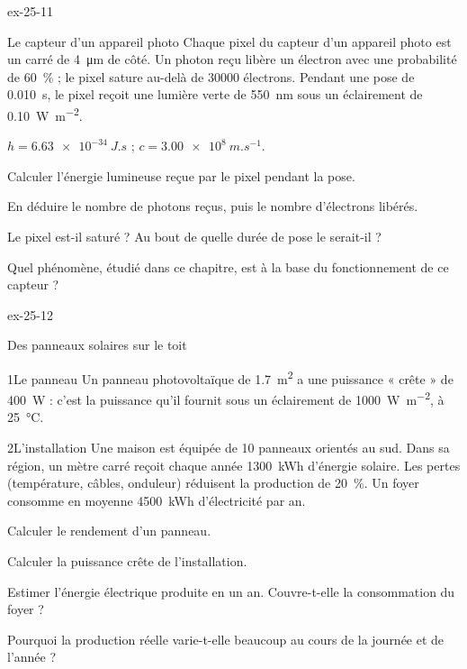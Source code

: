 \begin{blocLivre}{ex-25-11}
\begin{exercice}[2]{Le capteur d'un appareil photo}
Chaque pixel du capteur d'un appareil photo est un carré de \qty{4}{\micro m} de côté. Un photon reçu libère un électron avec
une probabilité de 60~\% ; le pixel sature au-delà de \num{30000} électrons. Pendant une pose de \qty{0,010}{s}, le pixel reçoit
une lumière verte de \qty{550}{nm} sous un éclairement de \qty{0,10}{W.m^{-2}}.
\begin{donnees}
$h=\qty{6,63e-34}{J.s}$ ; $c=\qty{3,00e8}{m.s^{-1}}$.
\end{donnees}
\begin{questions}
\item Calculer l'énergie lumineuse reçue par le pixel pendant la pose.
\item En déduire le nombre de photons reçus, puis le nombre d'électrons libérés.
\item Le pixel est-il saturé ? Au bout de quelle durée de pose le serait-il ?
\item Quel phénomène, étudié dans ce chapitre, est à la base du fonctionnement de ce capteur ?
\end{questions}
\end{exercice}
\end{blocLivre}
\begin{blocLivre}{ex-25-12}
\begin{exercice}[3]{Des panneaux solaires sur le toit}
\begin{docu}{1}{Le panneau}
Un panneau photovoltaïque de \qty{1,7}{m^2} a une puissance « crête » de \qty{400}{W} : c'est la puissance qu'il fournit sous un
éclairement de \qty{1000}{W.m^{-2}}, à \qty{25}{\degreeCelsius}.
\end{docu}
\begin{docu}{2}{L'installation}
Une maison est équipée de 10 panneaux orientés au sud. Dans sa région, un mètre carré reçoit chaque année
\qty{1300}{kWh} d'énergie solaire. Les pertes (température, câbles, onduleur) réduisent la production de 20~\%. Un foyer
consomme en moyenne \qty{4500}{kWh} d'électricité par an.
\end{docu}
\begin{questions}
\item Calculer le rendement d'un panneau.
\item Calculer la puissance crête de l'installation.
\item \initiative Estimer l'énergie électrique produite en un an. Couvre-t-elle la consommation du foyer ?
\item Pourquoi la production réelle varie-t-elle beaucoup au cours de la journée et de l'année ?
\end{questions}
\end{exercice}
\end{blocLivre}

